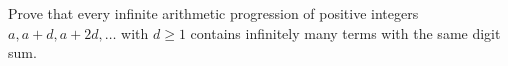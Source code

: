 Prove that every infinite arithmetic progression of positive integers $a,a+d,a+2d,\dots$ with $d\ge1$ contains infinitely many terms with the same digit sum.
